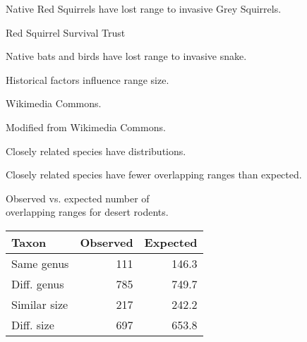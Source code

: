 \documentclass[t]{beamer}
\begin{document}
{
\begin{frame}[b,plain]{Native Red Squirrels have lost range to invasive Grey Squirrels.}
	
	\tiny\hfill Red Squirrel Survival Trust
\end{frame}
}

{
\begin{frame}[b,plain]{Native bats and birds have lost range to invasive snake.}
\end{frame}
}

{
\begin{frame}[b,plain]{Historical factors influence range size.}
\end{frame}
}

{
\begin{frame}[b,plain]
\tiny Wikimedia Commons.
\end{frame}
}


{
\begin{frame}[b,plain]
	\tiny Modified from Wikimedia Commons.
\end{frame}
}

{
\begin{frame}[t,plain]{Closely related species have  distributions.}
\end{frame}
}

\begin{frame}[t,plain]{Closely related species have fewer overlapping ranges than expected.}

	\begin{center}
		\hangpara Observed vs. expected number of \\\hspace{0.5em} overlapping ranges for desert rodents.

		\begin{tabular}{@{}lrr@{}}
		\toprule
		Taxon & Observed & Expected \tabularnewline
		\midrule
		Same genus & 111 & 146.3 \tabularnewline
		Diff. genus & 785 & 749.7 \tabularnewline
		Similar size & 217 & 242.2 \tabularnewline
		Diff. size & 697 & 653.8 \tabularnewline
		\bottomrule
		\end{tabular}
	\end{center}
\end{frame}

{
\begin{frame}[b,plain]
\end{frame}
}
\end{document}
